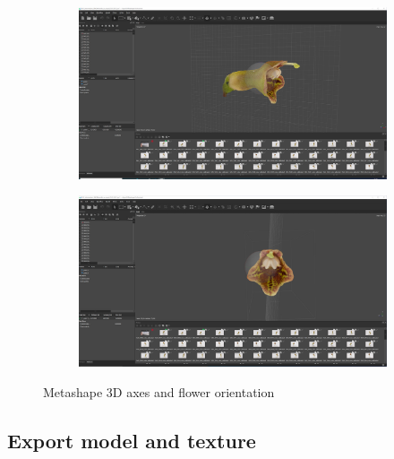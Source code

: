 \documentclass[10pt,letter,english]{article}
\begin{document}
\begin{figure}[H]
\centering
\begin{subfigure}{0.9\textwidth}
  \centering
  \includegraphics[width=1\textwidth]{Figures/metashape_orientation.png}
  \caption{}
  \label{}
\end{subfigure}

\begin{subfigure}{0.9\textwidth}
  \centering
  \includegraphics[width=1\textwidth]{Figures/metashape_orientation_2.png}
  \caption{}
  \label{}
\end{subfigure}
\caption{Metashape 3D axes and flower orientation}
\label{flower_orientation}
\end{figure}






\subsection{Export model and texture}
 
\end{document}

